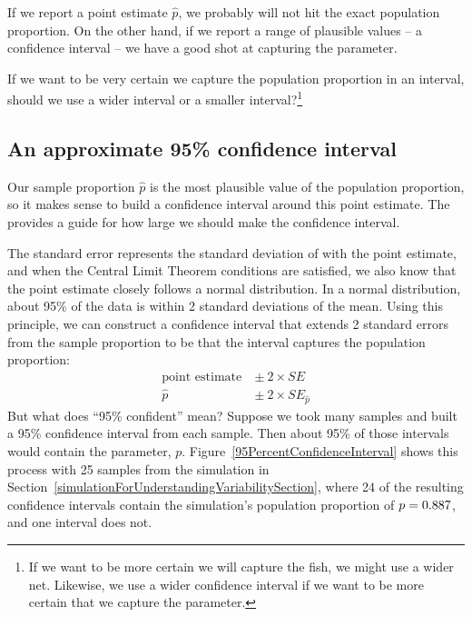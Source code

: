 If we report a point estimate $\hat{p}$, we probably
will not hit the exact population proportion. On the
other hand, if we report a range of plausible values
-- a confidence interval -- we have a good shot at
capturing the parameter. 

\begin{exercise}
If we want to be very certain we capture the population
proportion in an interval, should we use a wider interval
or a smaller interval?\footnote{If we want to be more
certain we will capture the fish, we might use a
wider net. Likewise, we use a wider confidence interval
if we want to be more certain that we capture the
parameter.}
\end{exercise}

\subsection{An approximate 95\% confidence interval}

Our sample proportion $\hat{p}$ is the most plausible
value of the population proportion, so it makes sense
to build a confidence interval around this point estimate.
The  provides a guide for how
large we should make the confidence interval.

The standard error represents the standard deviation
of with the point estimate, and when the Central
Limit Theorem conditions are satisfied, we also know
that the point estimate closely follows a normal
distribution. In a normal distribution, about 95\% of
the data is within 2 standard deviations of the mean.
Using this principle, we can construct a confidence
interval that extends 2 standard errors from the sample
proportion to be 
that the interval captures the population proportion:
\begin{align*}
\text{point estimate}\ &\pm\ 2\times SE \\
\hat{p}\ &\pm\ 2\times SE_{\hat{p}}
\end{align*}
But what does ``95\% confident'' mean? Suppose we took
many samples and built a 95\% confidence interval from
each sample. Then about 95\% of those intervals would
contain the parameter, $p$.
Figure~\ref{95PercentConfidenceInterval} shows this
process with 25 samples from the simulation in
Section~\ref{simulationForUnderstandingVariabilitySection},
where 24 of the resulting confidence intervals contain
the simulation's population proportion of
$p = 0.887{}$, and one interval does not.

